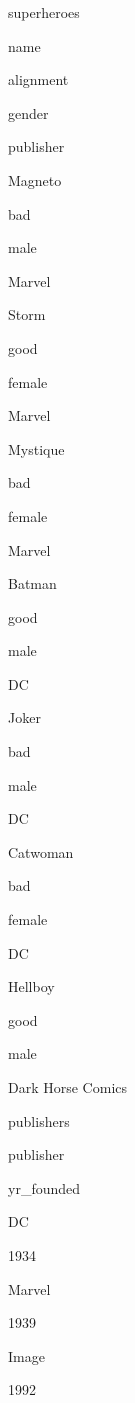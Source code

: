 superheroes
 


name
 
alignment
 
gender
 
publisher
 



Magneto
 
bad
 
male
 
Marvel
 


Storm
 
good
 
female
 
Marvel
 


Mystique
 
bad
 
female
 
Marvel
 


Batman
 
good
 
male
 
DC
 


Joker
 
bad
 
male
 
DC
 


Catwoman
 
bad
 
female
 
DC
 


Hellboy
 
good
 
male
 
Dark Horse Comics
 


publishers
 


publisher
 
yr_founded
 



DC
 
1934
 


Marvel
 
1939
 


Image
 
1992
 


